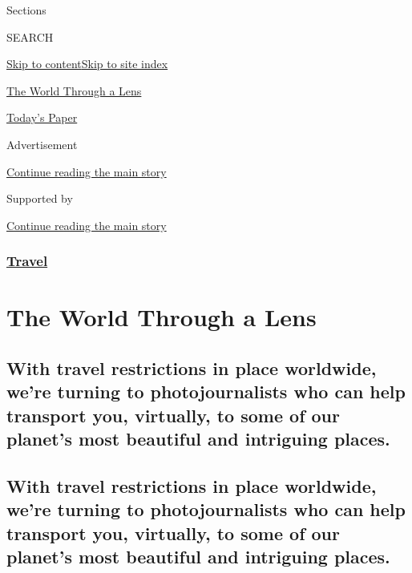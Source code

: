 Sections

SEARCH

\protect\hyperlink{site-content}{Skip to
content}\protect\hyperlink{site-index}{Skip to site index}

\href{https://www.nytimes.com/column/the-world-through-a-lens}{The World
Through a Lens}

\href{https://myaccount.nytimes.com/auth/login?response_type=cookie\&client_id=vi}{}

\href{https://www.nytimes.com/section/todayspaper}{Today's Paper}

Advertisement

\protect\hyperlink{after-top}{Continue reading the main story}

Supported by

\protect\hyperlink{after-sponsor}{Continue reading the main story}

\hypertarget{travel}{%
\subsubsection{\texorpdfstring{\href{/section/travel}{Travel}}{Travel}}\label{travel}}

\hypertarget{the-world-through-a-lens}{%
\section{The World Through a Lens}\label{the-world-through-a-lens}}

\hypertarget{with-travel-restrictions-in-place-worldwide-were-turning-to-photojournalists-who-can-help-transport-you-virtually-to-some-of-our-planets-most-beautiful-and-intriguing-places}{%
\subsection{With travel restrictions in place worldwide, we're turning
to photojournalists who can help transport you, virtually, to some of
our planet's most beautiful and intriguing
places.}\label{with-travel-restrictions-in-place-worldwide-were-turning-to-photojournalists-who-can-help-transport-you-virtually-to-some-of-our-planets-most-beautiful-and-intriguing-places}}

\hypertarget{with-travel-restrictions-in-place-worldwide-were-turning-to-photojournalists-who-can-help-transport-you-virtually-to-some-of-our-planets-most-beautiful-and-intriguing-places-1}{%
\subsection{With travel restrictions in place worldwide, we're turning
to photojournalists who can help transport you, virtually, to some of
our planet's most beautiful and intriguing
places.}\label{with-travel-restrictions-in-place-worldwide-were-turning-to-photojournalists-who-can-help-transport-you-virtually-to-some-of-our-planets-most-beautiful-and-intriguing-places-1}}


